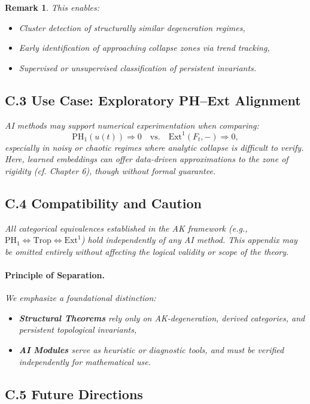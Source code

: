 \documentclass[11pt]{article}
\newtheorem{remark}[theorem]{Remark}
\begin{document}
\begin{remark}
This enables:
\begin{itemize}
  \item Cluster detection of structurally similar degeneration regimes,
  \item Early identification of approaching collapse zones via trend tracking,
  \item Supervised or unsupervised classification of persistent invariants.
\end{itemize}

\subsection*{C.3 Use Case: Exploratory PH–Ext Alignment}

AI methods may support numerical experimentation when comparing:
\[
\mathrm{PH}_1(u(t)) \Rightarrow 0 \quad \text{vs.} \quad \mathrm{Ext}^1(F_t, -) \Rightarrow 0,
\]
especially in noisy or chaotic regimes where analytic collapse is difficult to verify. Here, learned embeddings can offer data-driven approximations to the zone of rigidity (cf. Chapter 6), though without formal guarantee.

\subsection*{C.4 Compatibility and Caution}

All categorical equivalences established in the AK framework (e.g., \( \mathrm{PH}_1 \Leftrightarrow \mathrm{Trop} \Leftrightarrow \mathrm{Ext}^1 \)) hold independently of any AI method. This appendix may be omitted entirely without affecting the logical validity or scope of the theory.

\paragraph{Principle of Separation.}
We emphasize a foundational distinction:
\begin{itemize}
  \item \textbf{Structural Theorems} rely only on AK-degeneration, derived categories, and persistent topological invariants,
  \item \textbf{AI Modules} serve as heuristic or diagnostic tools, and must be verified independently for mathematical use.
\end{itemize}

\subsection*{C.5 Future Directions}


\end{remark}
\end{document}
